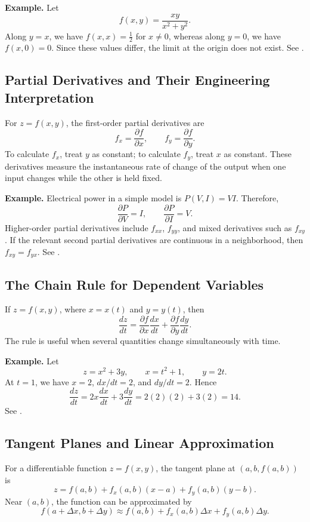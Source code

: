 \documentclass[a4paper,12pt]{article}
\theoremstyle{mystyle}
\numberwithin{equation}{section}
\numberwithin{theorem}{section}
\numberwithin{proposition}{section}
\numberwithin{example}{section}
\numberwithin{remark}{section}
\numberwithin{lemma}{section}
\numberwithin{corollary}{section}
\numberwithin{definition}{section}
\begin{document}
\textbf{Example.} Let
\[
f(x,y)=\frac{xy}{x^2+y^2}.
\]
Along $y=x$, we have $f(x,x)=\frac12$ for $x\ne0$, whereas along $y=0$, we have $f(x,0)=0$. Since these values differ, the limit at the origin does not exist. See \cite[Section 4.2]{strangherman2016}.

\subsection{Partial Derivatives and Their Engineering Interpretation}

For $z=f(x,y)$, the first-order partial derivatives are
\[
f_x=\frac{\partial f}{\partial x},
\qquad
f_y=\frac{\partial f}{\partial y}.
\]
To calculate $f_x$, treat $y$ as constant; to calculate $f_y$, treat $x$ as constant. These derivatives measure the instantaneous rate of change of the output when one input changes while the other is held fixed.

\textbf{Example.} Electrical power in a simple model is $P(V,I)=VI$. Therefore,
\[
\frac{\partial P}{\partial V}=I,
\qquad
\frac{\partial P}{\partial I}=V.
\]
Higher-order partial derivatives include $f_{xx}$, $f_{yy}$, and mixed derivatives such as $f_{xy}$. If the relevant second partial derivatives are continuous in a neighborhood, then $f_{xy}=f_{yx}$. See \cite[Section 4.3]{strangherman2016}.

\subsection{The Chain Rule for Dependent Variables}

If $z=f(x,y)$, where $x=x(t)$ and $y=y(t)$, then
\[
\frac{dz}{dt}
=\frac{\partial f}{\partial x}\frac{dx}{dt}
+\frac{\partial f}{\partial y}\frac{dy}{dt}.
\]
The rule is useful when several quantities change simultaneously with time.

\textbf{Example.} Let
\[
z=x^2+3y,\qquad x=t^2+1,\qquad y=2t.
\]
At $t=1$, we have $x=2$, $dx/dt=2$, and $dy/dt=2$. Hence
\[
\frac{dz}{dt}=2x\frac{dx}{dt}+3\frac{dy}{dt}
=2(2)(2)+3(2)=14.
\]
See \cite[Section 4.5]{strangherman2016}.

\subsection{Tangent Planes and Linear Approximation}

For a differentiable function $z=f(x,y)$, the tangent plane at $(a,b,f(a,b))$ is
\[
z=f(a,b)+f_x(a,b)(x-a)+f_y(a,b)(y-b).
\]
Near $(a,b)$, the function can be approximated by
\[
f(a+\Delta x,b+\Delta y)
\approx f(a,b)+f_x(a,b)\Delta x+f_y(a,b)\Delta y.
\]
\end{document}
